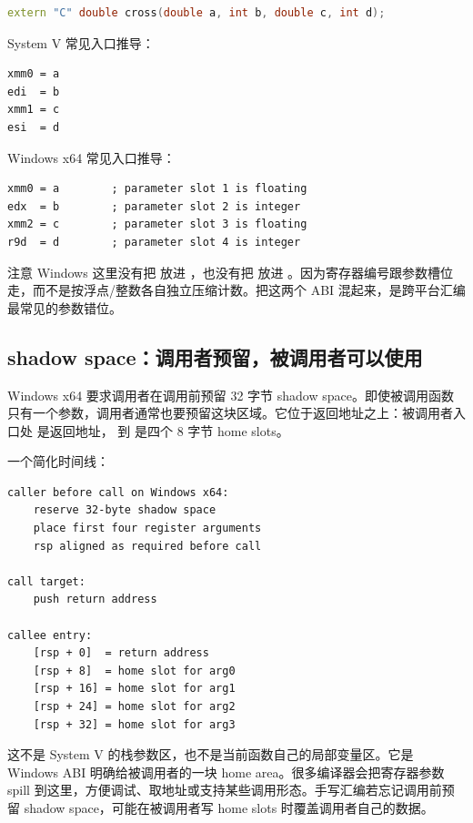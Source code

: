 \begin{lstlisting}[language=C++]
extern "C" double cross(double a, int b, double c, int d);
\end{lstlisting}

System V 常见入口推导：

\begin{lstlisting}
xmm0 = a
edi  = b
xmm1 = c
esi  = d
\end{lstlisting}

Windows x64 常见入口推导：

\begin{lstlisting}
xmm0 = a        ; parameter slot 1 is floating
edx  = b        ; parameter slot 2 is integer
xmm2 = c        ; parameter slot 3 is floating
r9d  = d        ; parameter slot 4 is integer
\end{lstlisting}

注意 Windows 这里没有把  放进 ，也没有把  放进 。因为寄存器编号跟参数槽位走，而不是按浮点/整数各自独立压缩计数。把这两个 ABI 混起来，是跨平台汇编最常见的参数错位。

\subsection{shadow space：调用者预留，被调用者可以使用}

Windows x64 要求调用者在调用前预留 32 字节 shadow space。即使被调用函数只有一个参数，调用者通常也要预留这块区域。它位于返回地址之上：被调用者入口处 \code{[rsp]} 是返回地址，\code{[rsp + 8]} 到 \code{[rsp + 39]} 是四个 8 字节 home slots。

一个简化时间线：

\begin{lstlisting}
caller before call on Windows x64:
    reserve 32-byte shadow space
    place first four register arguments
    rsp aligned as required before call

call target:
    push return address

callee entry:
    [rsp + 0]  = return address
    [rsp + 8]  = home slot for arg0
    [rsp + 16] = home slot for arg1
    [rsp + 24] = home slot for arg2
    [rsp + 32] = home slot for arg3
\end{lstlisting}

这不是 System V 的栈参数区，也不是当前函数自己的局部变量区。它是 Windows ABI 明确给被调用者的一块 home area。很多编译器会把寄存器参数 spill 到这里，方便调试、取地址或支持某些调用形态。手写汇编若忘记调用前预留 shadow space，可能在被调用者写 home slots 时覆盖调用者自己的数据。

